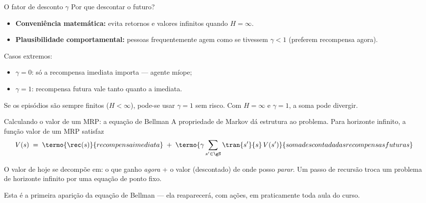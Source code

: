 \documentclass[aspectratio=169, 11pt]{beamer}
\begin{document}
\begin{frame}{O fator de desconto $\gamma$}
  Por que descontar o futuro?
  \begin{itemize}
    \item \textbf{Conveniência matemática:} evita retornos e valores
          infinitos quando $H = \infty$.
    \item \textbf{Plausibilidade comportamental:} pessoas frequentemente
          agem como se tivessem $\gamma < 1$ (preferem recompensa agora).
  \end{itemize}

  \medskip
  Casos extremos:
  \begin{itemize}
    \item $\gamma = 0$: só a recompensa imediata importa — agente míope;
    \item $\gamma = 1$: recompensa futura vale tanto quanto a imediata.
  \end{itemize}

  \begin{alertabox}
    Se os episódios são sempre finitos ($H < \infty$), pode-se usar
    $\gamma = 1$ sem risco. Com $H = \infty$ e $\gamma = 1$, a soma pode
    divergir.
  \end{alertabox}
\end{frame}

\begin{frame}{Calculando o valor de um MRP: a equação de Bellman}
  A propriedade de Markov dá estrutura ao problema. Para horizonte
  infinito, a função valor de um MRP satisfaz
  \[
    V(s) \;=\; \termo{\rec(s)}{recompensa imediata}
      \;+\; \termo{\gamma \sum_{s' \in \gS} \tran{s'}{s}\, V(s')}%
                  {soma descontada das recompensas futuras}
  \]

  \begin{ideiabox}
    O valor de hoje se decompõe em: o que ganho \emph{agora} + o valor
    (descontado) de onde posso \emph{parar}. Um passo de recursão troca um
    problema de horizonte infinito por uma equação de ponto fixo.
  \end{ideiabox}

  {\small\color{rlCinza} Esta é a primeira aparição da equação de Bellman —
  ela reaparecerá, com ações, em praticamente toda aula do curso.}
\end{frame}
\end{document}
